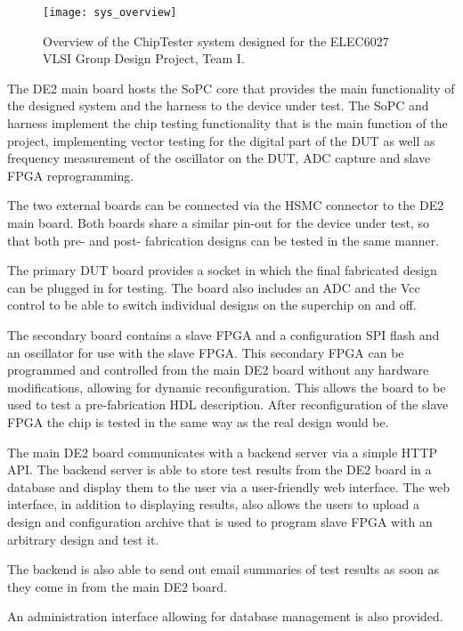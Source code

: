 \begin{figure}[h!]
\centering
\texttt{[image: sys\_overview]}
\caption{Overview of the ChipTester system designed for the ELEC6027 VLSI Group Design Project, Team I.}
\label{fig:intro_sys_overview}
\end{figure}


The DE2 main board hosts the SoPC core that provides the main functionality of
the designed system and the harness to the device under test. The SoPC and harness implement
the chip testing functionality that is the main function of the project, implementing
vector testing for the digital part of the DUT as well as frequency measurement of
the oscillator on the DUT, ADC capture and slave FPGA reprogramming.

The two external boards can be connected via the HSMC connector to the DE2 main board.
Both boards share a similar pin-out for the device under test, so that both pre- and post-
fabrication designs can be tested in the same manner.

The primary DUT board provides a socket in which the final fabricated design can
be plugged in for testing. The board also includes an ADC and the Vcc control to be
able to switch individual designs on the superchip on and off.

The secondary board contains a slave FPGA and a configuration SPI flash and an oscillator for
use with the slave FPGA. This secondary FPGA can be programmed and controlled from the
main DE2 board without any hardware modifications, allowing for dynamic reconfiguration.
This allows the board to be used to test a pre-fabrication HDL description.
After reconfiguration of the slave FPGA the chip is tested in the same way as the real
design would be.

The main DE2 board communicates with a backend server via a simple HTTP API. The
backend server is able to store test results from the DE2 board in a database and
display them to the user via a user-friendly web interface. The web interface,
in addition to displaying results, also allows the users to upload a design and configuration
archive that is used to program slave FPGA with an arbitrary design and test it.

The backend is also able to send out email summaries of test results as soon as they
come in from the main DE2 board.

An administration interface allowing for database management is also provided.










